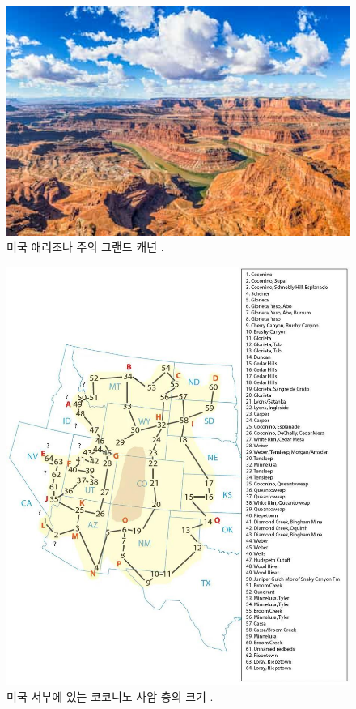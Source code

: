 \documentclass[10pt,twocolumn,letterpaper]{article}
\begin{document}
\begin{figure}[b]
\begin{center}
   \includegraphics[width=1\linewidth]{grand-canyon.jpg}
\end{center}
   \caption{미국 애리조나 주의 그랜드 캐년 \cite{49}.}
\label{fig:2}
\label{fig:onecol}
\end{figure}

\begin{figure}[t]
\begin{center}
   \includegraphics[width=1\linewidth]{coconino.jpg}
\end{center}
   \caption{미국 서부에 있는 코코니노 사암 층의 크기 \cite{21}.}
\label{fig:3}
\label{fig:onecol}
\end{figure}
\end{document}
